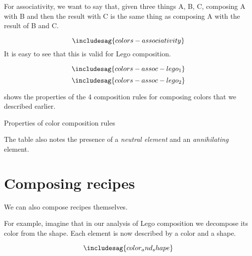For associativity, we want to say that, given three things A, B, C, composing A with B and then the result with C is the same thing as composing A with the result of B and C.

\begin{equation*}
  \includesag{colors-associativity}
\end{equation*}
It is easy to see that this is valid for Lego composition.

\begin{equation*}
  \includesag{colors-assoc-lego_1}
\end{equation*}
\begin{equation*}
  \includesag{colors-assoc-lego_2}
\end{equation*}

 shows the properties of the 4 composition rules for composing colors that we described earlier.


\begin{table*}\label{tab:color-properties}
  \caption{Properties of color composition rules}
\end{table*}

The table also notes the presence of a \emph{neutral element} and an \emph{annihilating} element.


%



\section{Composing recipes}

We can also compose recipes themselves.

For example, imagine that in our analysis of Lego composition we decompose its color from the shape.
Each element is now described by a color and a shape.

\begin{equation}
  \label{eq:color-and-shape}
\includesag{color_and_shape}
\end{equation}

